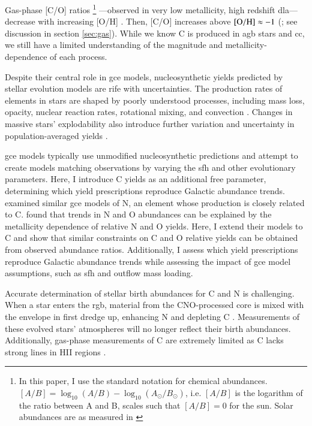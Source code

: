\documentclass[12pt,oneside,letterpaper]{report}
\newcommand{\cc}{\gls{cc}}
\newcommand{\agb}{\gls{agb}}
\newcommand{\sfh}{\gls{sfh}}
\newcommand{\dla}{\gls{dla}}
\newcommand{\gce}{\gls{gce}}
\newcommand{\Gce}{\Gls{gce}}
\newcommand{\sun}{\odot}
\begin{document}
Gas-phase [C/O] ratios%
%
\footnote{In this paper, I use the standard notation for chemical abundances. $[A/B] = \log_{10}\left(A/B\right) - \log_{10}\left(A_{\sun}/B_{\sun}\right)$, i.e. $[A/B]$ is the logarithm of the ratio between A and B, scales such that $[A/B]=0$ for the sun. Solar abundances are as measured in \citet{asplund+09}}%
%
---observed in very low \gls{metallicity}, high redshift \dla{}---decrease with increasing [O/H] \citep{FN15, cooke+17}. Then, [C/O] increases above $\rm [O/H] \approx -1$ (\citealt{berg+19}; see discussion in section \ref{sec:gas}).
While we know C is produced in \agb{} stars and \cc{}, we still have a limited understanding of the magnitude and metallicity-dependence of each process.


Despite their central role in \gce{} models, nucleosynthetic yields predicted by stellar evolution models are rife with uncertainties. The production rates of elements in stars are shaped by poorly understood processes, including mass loss, opacity, nuclear reaction rates, rotational mixing, and convection \citep{KL14,ventura+13, LC18}.
Changes in massive stars' explodability also introduce further variation and uncertainty in population-averaged yields \citep{emily+21}.

\Gce{} models typically use unmodified nucleosynthetic predictions and attempt to create models matching observations by varying the \sfh{} and other evolutionary parameters. Here, I introduce C yields as an additional free parameter, determining which yield prescriptions reproduce Galactic abundance trends.
\cite{james+23} examined similar \gce{} models of N, an element whose production is closely related to C. \cite{james+23} found that trends in N and O abundances can be explained by the metallicity dependence of relative N and O yields. Here, I extend their models to C and show that similar constraints on C and O relative yields can be obtained from observed abundance ratios. Additionally, I assess which yield prescriptions reproduce Galactic abundance trends while assessing the impact of \gce{} model assumptions, such as \sfh{} and outflow mass loading.

Accurate determination of stellar birth abundances for C and N is challenging. When a star enters the \gls{rgb}, material from the CNO-processed core is mixed with the envelope in first dredge up, enhancing N and depleting C \citep{iben67, vincenzo+21,KL14}. Measurements of these evolved stars'  atmospheres will no longer reflect their birth abundances.  Additionally, gas-phase measurements of C are extremely limited as C lacks strong lines in HII regions \citep{skillman+20}.
\end{document}
